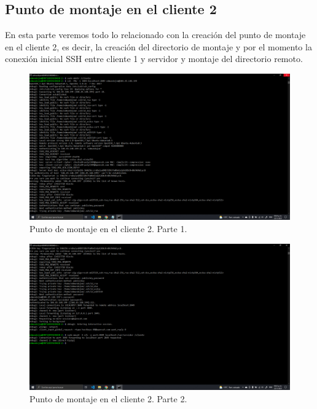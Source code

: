 \documentclass[11pt]{article}
\begin{document}
		\subsection{Punto de montaje en el cliente 2}
		En esta parte veremos todo lo relacionado con la creación del punto de montaje en el cliente 2, es decir, la creación del directorio de montaje y por el momento la conexión inicial SSH entre cliente 1 y servidor y montaje del directorio remoto.
		\begin{figure}[H]
			\centering
			\includegraphics[scale=0.34]{resources/cliente2.1.png}
			\caption{Punto de montaje en el cliente 2. Parte 1.}\label{fig:picture}
		\end{figure}
		\begin{figure}[H]
			\centering
			\includegraphics[scale=0.34]{resources/cliente2.2.png}
			\caption{Punto de montaje en el cliente 2. Parte 2.}\label{fig:picture}
		\end{figure}	
	
\end{document}
